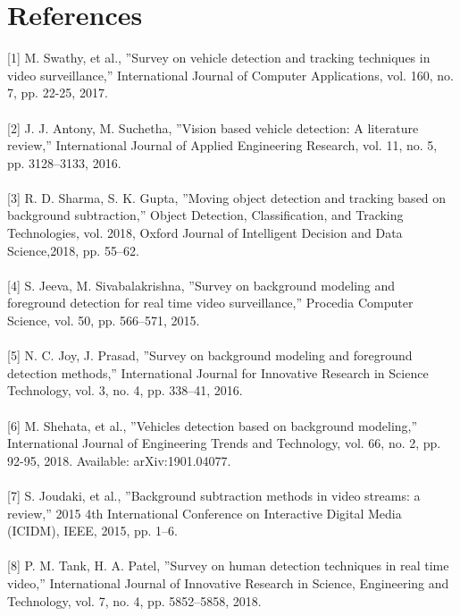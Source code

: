 \documentclass[12pt,a4paper,roman]{article}
\begin{document}
\section{References}
{{[1] M. Swathy, et al., ”Survey on vehicle detection and tracking techniques in video surveillance,” International Journal of Computer Applications, vol. 160, no. 7, pp. 22-25, 2017.}
\\
\\
 {[2] J. J. Antony, M. Suchetha, ”Vision based vehicle detection: A literature review,” International Journal of Applied Engineering Research, vol. 11, no. 5, pp. 3128–3133, 2016.}
\\
\\
{[3] R. D. Sharma, S. K. Gupta, ”Moving object detection and tracking based on background subtraction,” Object Detection, Classiﬁcation, and Tracking Technologies, vol. 2018, Oxford Journal of Intelligent Decision and Data Science,2018, pp. 55–62.
}
\\
\\
{\hspace{-6mm}[4] S. Jeeva, M. Sivabalakrishna, ”Survey on background modeling and foreground detection for real time video surveillance,” Procedia Computer Science, vol. 50, pp. 566–571, 2015.\\
}
\\
{
[5] N. C. Joy, J. Prasad, ”Survey on background modeling and foreground detection methods,” International Journal for Innovative Research in Science Technology, vol. 3, no. 4, pp. 338–41, 2016.\\
}
\\
{
[6] M. Shehata, et al., ”Vehicles detection based on background modeling,” International Journal of Engineering Trends and Technology, vol. 66, no. 2, pp. 92-95, 2018. Available: arXiv:1901.04077.\\
}
\\
{
[7] S. Joudaki, et al., ”Background subtraction methods in video streams: a review,” 2015 4th International Conference on Interactive Digital Media (ICIDM), IEEE, 2015, pp. 1–6.\\
}
\\
{
[8] P. M. Tank, H. A. Patel, ”Survey on human detection techniques in real time video,” International Journal of Innovative Research in Science, Engineering and Technology, vol. 7, no. 4, pp. 5852–5858, 2018.
}
\\
}
\end{document}
